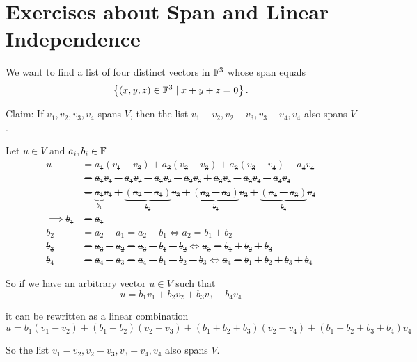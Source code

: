\section*{Exercises about Span and Linear Independence}

\begin{xrcs}
  We want to find a list of four distinct vectors in $\mathbb{F}^3$ whose span equals
  \begin{equation}
    \left \{  \left(x,y,z \right) \in \mathbb{F}^3 \mid x + y + z = 0 \right \}.
  \end{equation}
\end{xrcs}

\begin{xrcs}
  Claim: If $v_1, v_2, v_3, v_4$ spans $V$, then the list $v_1 - v_2, v_2 -v_3, v_3 -v_4, v_4$ also spans $V$.

  \begin{xprf}
    Let $u \in V$ and $a_i, b_i \in \mathbb{F}$ \st
    \[
    \begin{aligned}
      u
      &= a_1 (v_1 -v_2) + a_2 (v_2-v_3) + a_3 (v_3-v_4)-a_4 v_4 \\
      &= a_1 v_1 - a_1 v_2 + a_2v_2 - a_2 v_3 + a_3 v_3 - a_3 v_4 + a_4 v_4 \\
      &= \underbrace{a_1}_{b_1} v_1 + \underbrace{(a_2 -a_1)}_{b_2} v_2 + \underbrace{(a_3 -a_2)}_{b_3} v_3 + \underbrace{(a_4 -a_3)}_{b_4} v_4 \\
      \implies b_1 & = a_1 \\
      b_2 &= a_2 -a_1 = a_2 - b_1 \iff a_2 = b_1 + b_2 \\
      b_3 &= a_3 - a_2 = a_3 - b_1 -b_2 \iff a_3 = b_1 + b_2 + b_3 \\
      b_4 &= a_4 - a_3 = a_4 - b_1 - b_2 - b_3 \iff a_4 = b_1 + b_2 + b_3 + b_4
    \end{aligned}
    \]

    So if we have an arbitrary vector $u \in V$ such that
    \[
    u = b_1 v_1 +  b_2 v_2 + b_3 v_3 + b_4 v_4
    \]

    it can be rewritten as a linear combination
    \[
    u = b_1 (v_1 - v_2) + (b_1-b_2)(v_2-v_3) + (b_1+b_2+b_3)(v_2-v_4)+(b_1+b_2+b_3+b_4)v_4
    \]

    So the list $v_1 - v_2, v_2 -v_3, v_3 -v_4, v_4$ also spans $V$.
  \end{xprf}
\end{xrcs}


